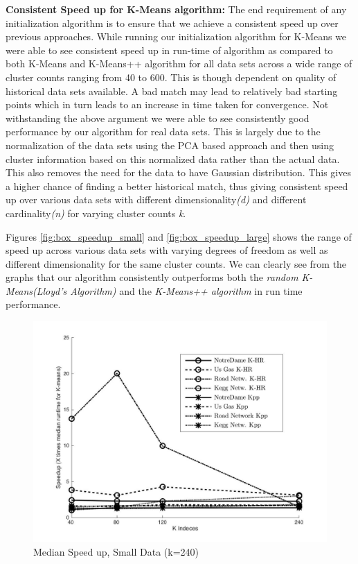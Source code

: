 \textbf{Consistent Speed up for K-Means algorithm:} The end requirement of any initialization algorithm is to ensure that we achieve a consistent speed up over previous approaches. While running our initialization algorithm for K-Means we were able to see consistent speed up in run-time of algorithm as compared to both K-Means and K-Means++ algorithm for all data sets across a wide range of cluster counts ranging from 40 to 600. This is though dependent on quality of historical data sets available. A bad match may lead to relatively bad starting points which in turn leads to an increase in time taken for convergence. Not withstanding the above argument we were able to see consistently good performance by our algorithm for real data sets. This is largely due to the normalization of the data sets using the PCA based approach and then using cluster information based on this normalized data rather than the actual data. This also removes the need for the data to have Gaussian distribution. This gives a higher chance of finding a better historical match, thus giving consistent speed up over various data sets with different dimensionality\textit{(d)} and different cardinality\textit{(n)} for varying cluster counts \textit{k}.

Figures \ref{fig:box_speedup_small} and \ref{fig:box_speedup_large} shows the range of speed up across various data sets with varying degrees of freedom as well as different dimensionality for the same cluster counts. We can clearly see from the graphs that our algorithm consistently outperforms both the \textit{random K-Means(Lloyd’s Algorithm)} and the \textit{K-Means++ algorithm} in run time performance.


\begin{figure}[p!]
    \includegraphics[width=\textwidth, height = 0.7\textheight, scale=1]{Chapter-5/figs/k_means_speedup_line_small}
    \caption{Median Speed up, Small Data (k=240)}
    \centering
    \label{fig:line_speedup_small}
\end{figure}


